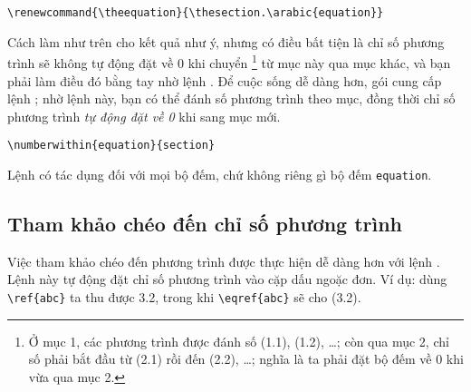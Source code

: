 \medskip
\begin{verbatim}
\renewcommand{\theequation}{\thesection.\arabic{equation}}
\end{verbatim}

\medskip
Cách làm như trên cho kết quả như ý, nhưng có điều bất tiện là chỉ số
phương trình sẽ không tự động đặt về 0 khi chuyển%
\footnote{Ở mục 1, các phương trình được đánh số (1.1), (1.2), \ldots;
còn qua mục 2, chỉ số phải bắt đầu từ (2.1) rồi đến (2.2), \ldots;
nghĩa là ta phải đặt bộ đếm về 0 khi vừa qua mục 2.}
từ mục này qua mục khác, và bạn phải làm điều đó bằng tay nhờ lệnh .
Để cuộc sống dễ dàng hơn, gói  cung cấp lệnh ;
nhờ lệnh này, bạn có thể đánh số phương trình theo mục, đồng thời
chỉ số phương trình \emph{tự động đặt về 0} khi sang mục mới.

\medskip
\begin{verbatim}
\numberwithin{equation}{section}
\end{verbatim}

\medskip
Lệnh  có tác dụng đối với mọi bộ đếm, chứ
không riêng gì bộ đếm \texttt{equation}.

\subsection{Tham khảo chéo đến chỉ số phương trình}

Việc tham khảo chéo đến phương trình được thực hiện dễ dàng hơn với lệnh
. Lệnh này tự động đặt chỉ số phương trình vào cặp dấu ngoặc đơn.
Ví dụ: dùng \verb'\ref{abc}' ta thu được 3.2,
trong khi \verb'\eqref{abc}' sẽ cho (3.2).

